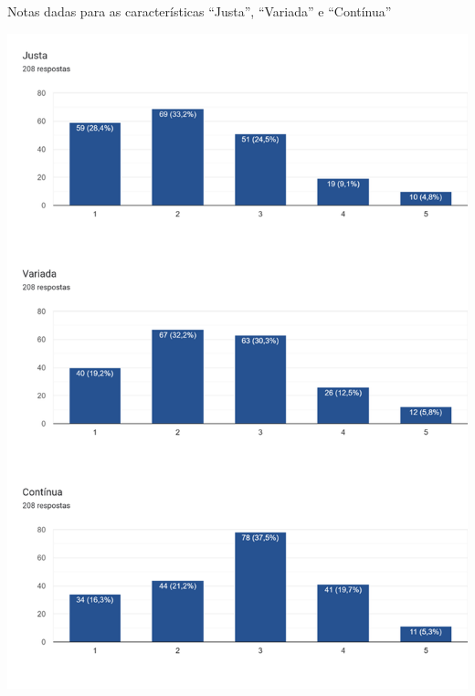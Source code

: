 
\begin{MyCenteredFigure}
  \caption{Notas dadas para as características ``Justa'', ``Variada'' e ``Contínua''}
  \label{fig:6.0-Opiniao-1_3}
  \includegraphics[width=\textwidth]{files/img/2.02!3-organizacao/2.02!3.1.4-forms/6.0-Opiniao-1_3}
\end{MyCenteredFigure}

